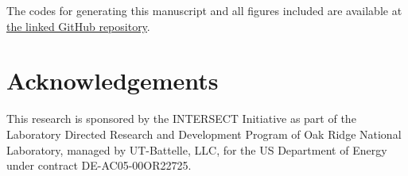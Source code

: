 \documentclass[aip, amsmath, amssymb, nobibnotes, nofootinbib, citeautoscript, reprint, superscriptaddress]{revtex4-1}
\begin{document}
    The codes for generating this manuscript and all figures included are available at \href{https://github.com/jacobhinkle/hex_interlacing}{the linked GitHub repository}. 

    \section*{\label{sec:acknowledgement}Acknowledgements}

    This research is sponsored by the INTERSECT Initiative as part of the Laboratory Directed Research and Development Program of Oak Ridge National Laboratory, managed by UT-Battelle, LLC, for the US Department of Energy under contract DE-AC05-00OR22725. 

    
\end{document}
